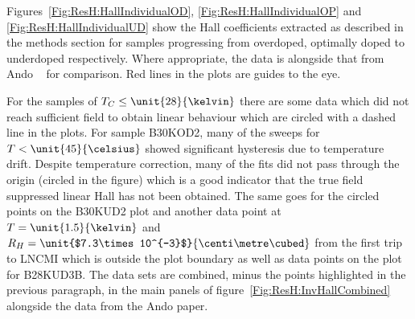 Figures~\ref{Fig:ResH:HallIndividualOD}, \ref{Fig:ResH:HallIndividualOP} and \ref{Fig:ResH:HallIndividualUD} show the Hall coefficients extracted as described in the methods section for samples progressing from overdoped, optimally doped to underdoped respectively. Where appropriate, the data is alongside that from Ando \etal~\cite{Ando1999} for comparison. Red lines in the plots are guides to the eye.

For the samples of $T_C \le \unit{28}{\kelvin}$ there are some data which did not reach sufficient field to obtain linear behaviour which are circled with a dashed line in the plots. For sample B30KOD2, many of the sweeps for $T < \unit{45}{\celsius}$ showed significant hysteresis due to temperature drift. Despite temperature correction, many of the fits did not pass through the origin (circled in the figure) which is a good indicator that the true field suppressed linear Hall has not been obtained. The same goes for the circled points on the B30KUD2 plot and another data point at $T=\unit{1.5}{\kelvin}$ and $R_H = \unit{$7.3\times10^{-3}$}{\centi\metre\cubed}$ from the first trip to \ac{LNCMI} which is outside the plot boundary as well as data points on the plot for B28KUD3B. The data sets are combined, minus the points highlighted in the previous paragraph, in the main panels of figure~\ref{Fig:ResH:InvHallCombined} alongside the data from the Ando paper.

